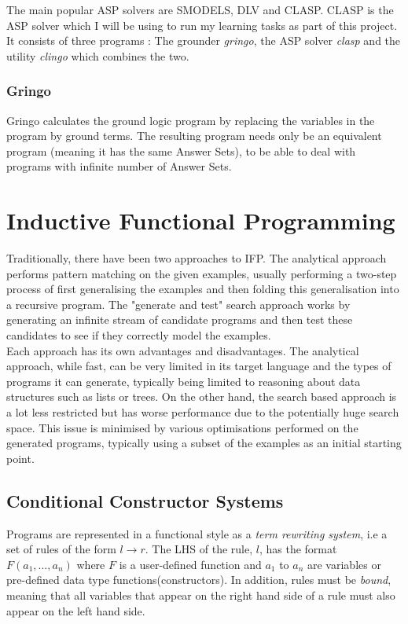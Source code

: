 The main popular ASP solvers are SMODELS, DLV and CLASP. CLASP is the ASP solver which I will be using to run my learning tasks as part of this project. It consists of three programs : The grounder \textit{gringo}, the ASP solver \textit{clasp} and the utility \textit{clingo} which combines the two.

\subsubsection{Gringo}

Gringo calculates the ground logic program by replacing the variables in the program by ground terms. The resulting program needs only be an equivalent program (meaning it has the same Answer Sets), to be able to deal with programs with infinite number of Answer Sets.

\section{Inductive Functional Programming}

Traditionally, there have been two approaches to IFP. The analytical approach performs pattern matching on the given examples, usually performing a two-step process of first generalising the examples and then folding this generalisation into a recursive program. The "generate and test" search approach works by generating an infinite stream of candidate programs and then test these candidates to see if they correctly model the examples. \\

Each approach has its own advantages and disadvantages. The analytical approach, while fast, can be very limited in its target language and the types of programs it can generate, typically being limited to reasoning about data structures such as lists or trees. On the other hand, the search based approach is a lot less restricted but has worse performance due to the potentially huge search space. This issue is minimised by various optimisations performed on the generated programs, typically using a subset of the examples as an initial starting point.

\subsection{Conditional Constructor Systems}

Programs are represented in a functional style as a \textit{term rewriting system}, i.e a set of rules of the form $l \rightarrow r$. The LHS of the rule, $l$, has the format $F(a_1, \dots, a_n)$ where $F$ is a user-defined function and $a_1$ to $a_n$ are variables or pre-defined data type functions(constructors). In addition, rules must be \textit{bound}, meaning that all variables that appear on the right hand side of a rule must also appear on the left hand side.\\

